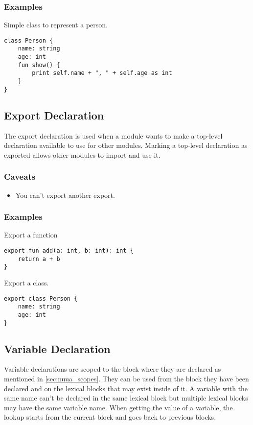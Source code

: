 \subsubsection{Examples}

Simple class to represent a person.
\begin{lstlisting}
class Person {
    name: string
    age: int
    fun show() {
        print self.name + ", " + self.age as int
    }
}
\end{lstlisting}

\subsection{Export Declaration}

The export declaration is used when a module wants to make a top-level declaration available to use for other
modules. Marking a top-level declaration as exported allows other modules to import and use it.

\subsubsection{Caveats}

\begin{itemize}
    \item You can't export another export.
\end{itemize}

\subsubsection{Examples}

Export a function
\begin{lstlisting}
export fun add(a: int, b: int): int {
    return a + b
}
\end{lstlisting}
Export a class.
\begin{lstlisting}
export class Person {
    name: string
    age: int
}
\end{lstlisting}

\subsection{Variable Declaration}

Variable declarations are scoped to the block where they are declared as mentioned in \autoref{sec:nuua_scopes}.
They can be used from the block they have been declared and on the lexical blocks that may exist inside of it.
A variable with the same name can't be declared in the same lexical block but multiple lexical
blocks may have the same variable name. When getting the value of a variable, the lookup starts from the current block and goes back to previous blocks.


